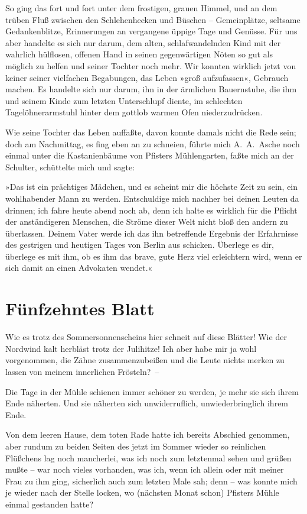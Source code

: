 So ging das fort und fort unter dem frostigen, grauen Himmel, und
an dem trüben Fluß zwischen den Schlehenhecken und Büschen –
Gemeinplätze, seltsame Gedankenblitze, Erinnerungen an vergangene
üppige Tage und Genüsse. Für uns aber handelte es sich nur darum,
dem alten, schlafwandelnden Kind mit der wahrlich hülflosen,
offenen Hand in seinen gegenwärtigen Nöten so gut als möglich zu
helfen und seiner Tochter noch mehr. Wir konnten wirklich jetzt von
keiner seiner vielfachen Begabungen, das Leben »groß aufzufassen«,
Gebrauch machen. Es handelte sich nur darum, ihn in der ärmlichen
Bauernstube, die ihm und seinem Kinde zum letzten Unterschlupf
diente, im schlechten Tagelöhnerarmstuhl hinter dem gottlob warmen
Ofen niederzudrücken.

Wie seine Tochter das Leben auffaßte, davon konnte damals nicht die
Rede sein; doch am Nachmittag, es fing eben an zu schneien, führte
mich A.~A.~Asche noch einmal unter die Kastanienbäume von Pfisters
Mühlengarten, faßte mich an der Schulter, schüttelte mich und
sagte:

»Das ist ein prächtiges Mädchen, und es scheint mir die höchste
Zeit zu sein, ein wohlhabender Mann zu werden. Entschuldige mich
nachher bei deinen Leuten da drinnen; ich fahre heute abend noch
ab, denn ich halte es wirklich für die Pflicht der anständigeren
Menschen, die Ströme dieser Welt nicht bloß den andern zu
überlassen. Deinem Vater werde ich das ihn betreffende Ergebnis der
Erfahrnisse des gestrigen und heutigen Tages von Berlin aus
schicken. Überlege es dir, überlege es mit ihm, ob es ihm das
brave, gute Herz viel erleichtern wird, wenn er sich damit an einen
Advokaten wendet.«

\section{Fünfzehntes Blatt}

Wie es trotz des Sommersonnenscheins hier schneit auf diese
Blätter! Wie der Nordwind kalt herbläst trotz der Julihitze! Ich
aber habe mir ja wohl vorgenommen, die Zähne zusammenzubeißen und
die Leute nichts merken zu lassen von meinem innerlichen
Frösteln?~–

Die Tage in der Mühle schienen immer schöner zu werden, je mehr sie
sich ihrem Ende näherten. Und sie näherten sich unwiderruflich,
unwiederbringlich ihrem Ende.

Von dem leeren Hause, dem toten Rade hatte ich bereits Abschied
genommen, aber rundum zu beiden Seiten des jetzt im Sommer wieder
so reinlichen Flüßchens lag noch mancherlei, was ich noch zum
letztenmal sehen und grüßen mußte – war noch vieles vorhanden, was
ich, wenn ich allein oder mit meiner Frau zu ihm ging, sicherlich
auch zum letzten Male sah; denn – was konnte mich je wieder nach
der Stelle locken, wo (nächsten Monat schon) Pfisters Mühle einmal
gestanden hatte?

